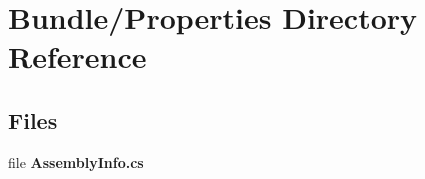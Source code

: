 \section{Bundle/\+Properties Directory Reference}
\label{dir_c42fe981b443c4ea8353d6ab80c9df6f}
\subsection*{Files}
\begin{DoxyCompactItemize}
\item 
file {\bfseries Assembly\+Info.\+cs}
\end{DoxyCompactItemize}
